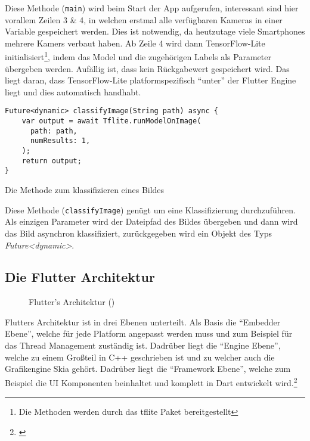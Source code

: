 Diese Methode (\texttt{main}) wird beim Start der App aufgerufen, interessant sind hier vorallem Zeilen 3 \& 4, in welchen erstmal alle verfügbaren Kameras in einer Variable gespeichert werden. Dies ist notwendig, da heutzutage viele Smartphones mehrere Kamers verbaut haben. Ab Zeile 4 wird dann TensorFlow-Lite initialisiert\footnote{Die Methoden werden durch das tflite Paket bereitgestellt\cite{tflitepackage}}, indem das Model und die zugehörigen Labels als Parameter übergeben werden. Aufällig ist, dass kein Rückgabewert gespeichert wird. Das liegt daran, dass TensorFlow-Lite platformspezifisch "`unter"' der Flutter Engine liegt und dies automatisch handhabt.

\begin{listing}[H]
    \begin{verbatim}
Future<dynamic> classifyImage(String path) async {
    var output = await Tflite.runModelOnImage(
      path: path,
      numResults: 1,
    );
    return output;
}
    \end{verbatim}
    \caption{Die Methode zum klassifizieren eines Bildes}
\end{listing}

Diese Methode (\texttt{classifyImage}) genügt um eine Klassifizierung durchzuführen. Als einzigen Parameter wird der Dateipfad des Bildes übergeben und dann wird das Bild asynchron klassifiziert, zurückgegeben wird ein Objekt des Typs \emph{Future<dynamic>}.

\subsection{Die Flutter Architektur}\label{anhang:flutterarc}

\begin{figure}[H]
    \centering
    \caption{Flutter's Architektur (\cite{flutterarchitecture})}
\end{figure}

Flutters Architektur ist in drei Ebenen unterteilt. Als Basis die "`Embedder Ebene"', welche für jede Platform angepasst werden muss und zum Beispiel für das Thread Management zuständig ist. Dadrüber liegt die "`Engine Ebene"', welche zu einem Großteil in C++ geschrieben ist und zu welcher auch die Grafikengine Skia gehört. Dadrüber liegt die "`Framework Ebene"', welche zum Beispiel die UI Komponenten beinhaltet und komplett in Dart entwickelt wird.\footnote{\cite{flutterarchitecture}}